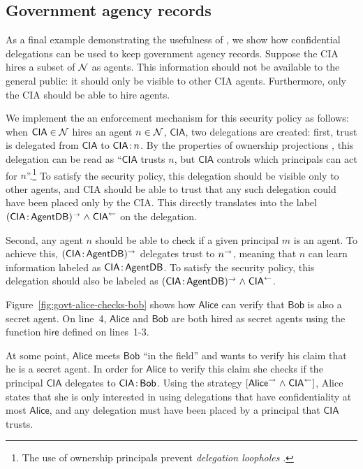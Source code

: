 \subsection{Government agency records}\label{subsec:agents}
As a final example demonstrating the usefulness of \lang, we show how confidential delegations can be used to keep government agency records. Suppose the CIA hires a subset of $\mathcal{N}$  as agents. 
This information should not be available to the general public: it should only be visible to other CIA agents. Furthermore, only the CIA should be able to hire agents.

We implement the an enforcement mechanism for this security policy as follows: when $\mathsf{CIA} \in \mathcal{N}$ hires an agent $n \in \mathcal{N}$, $\mathsf{CIA}$, two delegations are created: first, trust is delegated from $\mathsf{CIA}$ to $\mathsf{CIA} \colon \!n$. By the properties of ownership projections \cite{Arden:2015:FA:2859845.2859998}, this delegation can be read as ``$\mathsf{CIA}$ trusts $n$, but $\mathsf{CIA}$ controls which principals can act for $n$''.\footnote{The use of ownership principals prevent \emph{delegation loopholes} \cite{Arden:2015:FA:2859845.2859998}.} To satisfy the security policy, this delegation should be visible only to other agents, and CIA should be able to trust that any such delegation could have been placed only by the CIA. This directly translates into the label $(\mathsf{CIA} \colon \!\mathsf{AgentDB})^{\rightarrow} \mathrel{\land} \mathsf{CIA}^{\leftarrow}$ on the delegation.

Second, any agent $n$ should be able to check if a given principal $m$ is an agent. To achieve this, $(\mathsf{CIA} \colon \!\mathsf{AgentDB})^{\rightarrow}$ delegates trust to $n^{\rightarrow}$, meaning that $n$ can learn information labeled as $\mathsf{CIA} \colon \!\mathsf{AgentDB}$. To satisfy the security policy, this delegation should also be labeled as $(\mathsf{CIA} \colon \!\mathsf{AgentDB})^{\rightarrow} \mathrel{\land} \mathsf{CIA}^{\leftarrow}$.

Figure~\ref{fig:govt-alice-checks-bob} shows how $\mathsf{Alice}$ can verify that $\mathsf{Bob}$ is also a secret agent. On line~4, $\mathsf{Alice}$ and $\mathsf{Bob}$ are both hired as secret agents using the function $\mathsf{hire}$ defined on lines~1-3. 

At some point, $\mathsf{Alice}$ meets $\mathsf{Bob}$ ``in the field'' and wants to verify his claim that he is a secret agent. In order for $\mathsf{Alice}$ to verify this claim she checks if the principal $\mathsf{CIA}$ delegates to $\mathsf{CIA} \colon \!\mathsf{Bob}$. Using the strategy $[\mathsf{Alice}^{\rightarrow} \mathrel{\land} \mathsf{CIA}^{\leftarrow}]$, Alice states that she is only interested in using delegations that have confidentiality at most $\mathsf{Alice}$, and any delegation must have been placed by a principal that $\mathsf{CIA}$ trusts.

